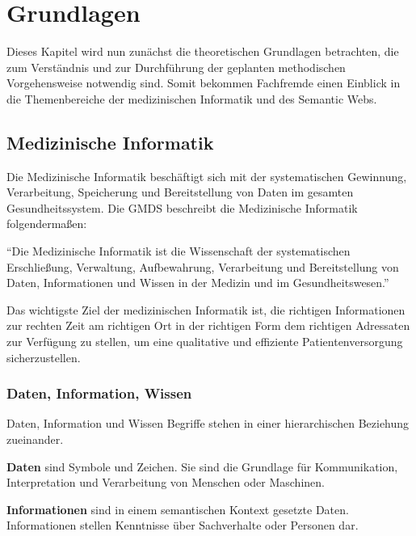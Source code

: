\chapter{Grundlagen}\label{ch:preliminaries}

Dieses Kapitel wird nun zunächst die theoretischen Grundlagen betrachten, die zum Verständnis und zur Durchführung der geplanten methodischen Vorgehensweise notwendig sind.
Somit bekommen Fachfremde einen Einblick in die Themenbereiche der medizinischen Informatik und des Semantic Webs.

\section{Medizinische Informatik}\label{sec:mi}

Die Medizinische Informatik beschäftigt sich mit der systematischen Gewinnung, Verarbeitung, Speicherung und Bereitstellung von Daten im gesamten Gesundheitssystem. 
Die \ac{GMDS} beschreibt die Medizinische Informatik folgendermaßen: \\

\begin{addmargin}[10pt]{10pt}
\enquote{Die Medizinische Informatik ist die Wissenschaft der systematischen Erschließung, Verwaltung, Aufbewahrung, Verarbeitung und Bereitstellung von Daten, Informationen und 	Wissen in der Medizin und im Gesundheitswesen.} \\
\end{addmargin}

Das wichtigste Ziel der medizinischen Informatik ist, die richtigen Informationen zur rechten Zeit am richtigen Ort in der richtigen Form dem richtigen Adressaten zur Verfügung zu stellen, um eine qualitative und effiziente Patientenversorgung sicherzustellen. \citep[vgl.]{winter_health_2011}

\subsection{Daten, Information, Wissen}

Daten, Information und Wissen Begriffe stehen in einer hierarchischen Beziehung zueinander.

\textbf{Daten} sind Symbole und Zeichen. Sie sind die Grundlage für Kommunikation, Interpretation und Verarbeitung von Menschen oder Maschinen.

\textbf{Informationen} sind in einem semantischen Kontext gesetzte Daten.
Informationen stellen Kenntnisse über Sachverhalte oder Personen dar.

